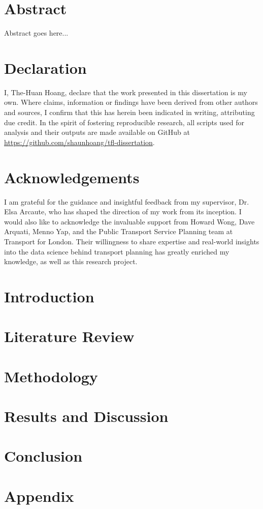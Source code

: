 \documentclass[12pt, twoside]{report}
\begin{document}


\chapter*{Abstract}
Abstract goes here...

\chapter*{Declaration}
I, The-Huan Hoang, declare that the work presented in this dissertation is my own. Where claims, information or findings have been derived from other authors and sources, I confirm that this has herein been indicated in writing, attributing due credit. In the spirit of fostering reproducible research, all scripts used for analysis and their outputs are made available on GitHub at \url{https://github.com/shaunhoang/tfl-dissertation}.

\chapter*{Acknowledgements}
I am grateful for the guidance and insightful feedback from my supervisor, Dr. Elsa Arcaute, who has shaped the direction of my work from its inception. I would also like to acknowledge the invaluable support from Howard Wong, Dave Arquati, Menno Yap, and the Public Transport Service Planning team at Transport for London. Their willingness to share expertise and real-world insights into the data science behind transport planning has greatly enriched my knowledge, as well as this research project.

\tableofcontents

\listoffigures

\listoftables

\chapter{Introduction}


\chapter{Literature Review}


\chapter{Methodology}


\chapter{Results and Discussion}


\chapter{Conclusion}


\appendix
\chapter*{Appendix}


\printbibliography{}
\end{document}
